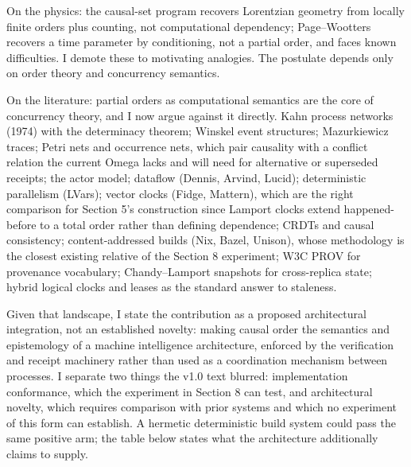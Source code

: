 \documentclass[11pt]{article}
\begin{document}
On the physics: the causal-set program recovers Lorentzian geometry from locally finite orders plus counting, not computational dependency; Page--Wootters recovers a time parameter by conditioning, not a partial order, and faces known difficulties. I demote these to motivating analogies. The postulate depends only on order theory and concurrency semantics.

On the literature: partial orders as computational semantics are the core of concurrency theory, and I now argue against it directly. Kahn process networks (1974) with the determinacy theorem; Winskel event structures; Mazurkiewicz traces; Petri nets and occurrence nets, which pair causality with a conflict relation the current Omega lacks and will need for alternative or superseded receipts; the actor model; dataflow (Dennis, Arvind, Lucid); deterministic parallelism (LVars); vector clocks (Fidge, Mattern), which are the right comparison for Section 5's construction since Lamport clocks extend happened-before to a total order rather than defining dependence; CRDTs and causal consistency; content-addressed builds (Nix, Bazel, Unison), whose methodology is the closest existing relative of the Section 8 experiment; W3C PROV for provenance vocabulary; Chandy--Lamport snapshots for cross-replica state; hybrid logical clocks and leases as the standard answer to staleness.

Given that landscape, I state the contribution as a proposed architectural integration, not an established novelty: making causal order the semantics and epistemology of a machine intelligence architecture, enforced by the verification and receipt machinery rather than used as a coordination mechanism between processes. I separate two things the v1.0 text blurred: implementation conformance, which the experiment in Section 8 can test, and architectural novelty, which requires comparison with prior systems and which no experiment of this form can establish. A hermetic deterministic build system could pass the same positive arm; the table below states what the architecture additionally claims to supply.
\end{document}
